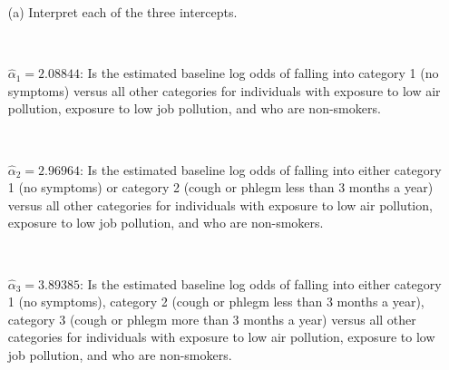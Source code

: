 \documentclass[]{article}
\begin{document}
\begin{itemize}
\item[(a)] Interpret each of the three intercepts.


\ 

 
$\hat{\alpha}_1 = 2.08844$: Is the estimated baseline log odds of falling into category 1 (no symptoms) versus all other categories for individuals with exposure to low air pollution, exposure to low job pollution, and who are non-smokers.

\ 
 
 $\hat{\alpha}_2 = 2.96964$: Is the estimated baseline log odds of falling into either category 1 (no symptoms) or category 2 (cough or phlegm less than 3 months a year) versus all other categories for individuals with exposure to low air pollution, exposure to low job pollution, and who are non-smokers.

\ 
 
 $\hat{\alpha}_3 = 3.89385$: Is the estimated baseline log odds of falling into either category 1 (no symptoms), category 2 (cough or phlegm less than 3 months a year), category 3 (cough or phlegm more than 3 months a year) versus all other categories for individuals with exposure to low air pollution, exposure to low job pollution, and who are non-smokers.
 
\end{itemize}

~
\end{document}
